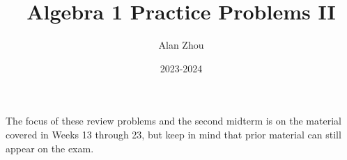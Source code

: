 \documentclass{article}
\title{Algebra 1 Practice Problems II}
\author{Alan Zhou}
\date{2023-2024}
\begin{document}
\maketitle

The focus of these review problems and the second midterm is on the material covered in Weeks 13 through 23, but keep in mind that prior material can still appear on the exam.

\tableofcontents






%
%
\end{document}
